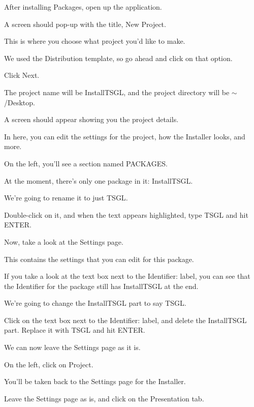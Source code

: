 After installing {\ttfamily Packages}, open up the application.

A screen should pop-\/up with the title, {\ttfamily New Project}.

This is where you choose what project you'd like to make.

We used the {\ttfamily Distribution} template, so go ahead and click on that option.

Click {\ttfamily Next}.

The project name will be {\ttfamily Install\-T\-S\-G\-L}, and the project directory will be {\ttfamily $\sim$/\-Desktop}.

A screen should appear showing you the project details.

In here, you can edit the settings for the project, how the Installer looks, and more.

On the left, you'll see a section named {\ttfamily P\-A\-C\-K\-A\-G\-E\-S}.

At the moment, there's only one package in it\-: {\ttfamily Install\-T\-S\-G\-L}.

We're going to rename it to just {\ttfamily T\-S\-G\-L}.

Double-\/click on it, and when the text appears highlighted, type {\ttfamily T\-S\-G\-L} and hit {\ttfamily E\-N\-T\-E\-R}.

Now, take a look at the {\ttfamily Settings} page.

This contains the settings that you can edit for this package.

If you take a look at the text box next to the {\ttfamily Identifier\-:} label, you can see that the Identifier for the package still has {\ttfamily Install\-T\-S\-G\-L} at the end.

We're going to change the {\ttfamily Install\-T\-S\-G\-L} part to say {\ttfamily T\-S\-G\-L}.

Click on the text box next to the {\ttfamily Identifier\-:} label, and delete the {\ttfamily Install\-T\-S\-G\-L} part. Replace it with {\ttfamily T\-S\-G\-L} and hit {\ttfamily E\-N\-T\-E\-R}.

We can now leave the {\ttfamily Settings} page as it is.

On the left, click on {\ttfamily Project}.

You'll be taken back to the {\ttfamily Settings} page for the Installer.

Leave the {\ttfamily Settings} page as is, and click on the {\ttfamily Presentation} tab.

